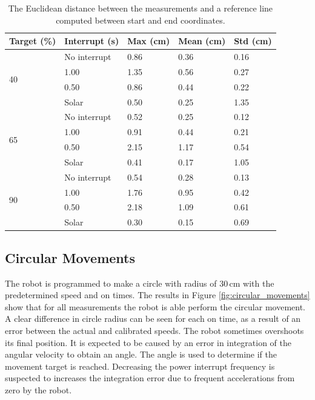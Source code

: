 \begin{table}[t]
	\centering
	\caption{The Euclidean distance between the measurements and a reference line computed between start and end coordinates.}
	\label{tab:straight_results}
	\begin{tabular}{|l|l||l|l|l|}
		\hline
		Target (\%) & Interrupt (s) & Max (cm) & Mean (cm) & Std (cm)\\
		\hline \hline
		\multirow{4}{*}{40} & No interrupt & 0.86 & 0.36 & 0.16 \\
		& 1.00 & 1.35 & 0.56 & 0.27 \\
		& 0.50 & 0.86 & 0.44 & 0.22 \\
		& Solar & 0.50 & 0.25 & 1.35 \\
		\hline
		\multirow{4}{*}{65} & No interrupt & 0.52 & 0.25 & 0.12 \\
		& 1.00 & 0.91 & 0.44 & 0.21 \\
		& 0.50 & 2.15 & 1.17 & 0.54 \\
		& Solar & 0.41 & 0.17 & 1.05 \\
		\hline
		\multirow{4}{*}{90} & No interrupt & 0.54 & 0.28 & 0.13 \\
		& 1.00 & 1.76 & 0.95 & 0.42 \\
		& 0.50 & 2.18 & 1.09 & 0.61 \\
		& Solar & 0.30 & 0.15 & 0.69 \\
		\hline
	\end{tabular}
\end{table}

\subsection{Circular Movements}

The robot is programmed to make a circle with radius of 30\,cm with the predetermined speed and on times.
The results in Figure \ref{fig:circular_movements} show that for all measurements the robot is able perform the circular movement.
A clear difference in circle radius can be seen for each on time, as a result of an error between the actual and calibrated speeds.
The robot sometimes overshoots its final position.
It is expected to be caused by an error in integration of the angular velocity to obtain an angle.
The angle is used to determine if the movement target is reached.
Decreasing the power interrupt frequency is suspected to increases the integration error due to frequent accelerations from zero by the robot.

